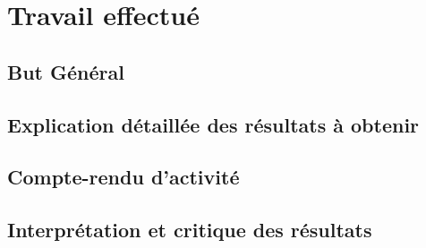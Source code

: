 \section{Travail effectué}
\subsection{But Général}
\subsection{Explication détaillée des résultats à obtenir}
\subsection{Compte-rendu d’activité}
\subsection{Interprétation et critique des résultats}

\newpage

